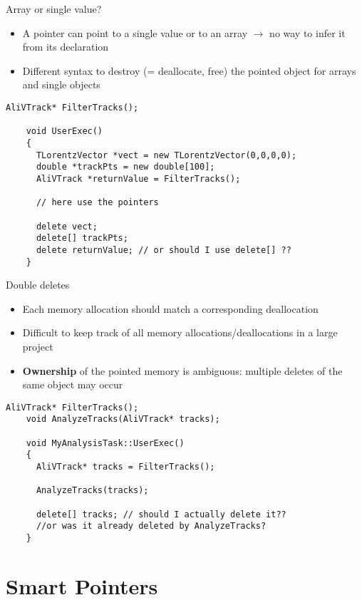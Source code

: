 \documentclass[xcolor={usenames,dvipsnames}]{beamer}
\begin{document}
\begin{frame}[fragile]{Array or single value?}
\begin{itemize}
\item A pointer can point to a single value or to an array $\rightarrow$ no way to infer it from its declaration
\item Different syntax to destroy (= deallocate, free) the pointed object for arrays and single objects 
\end{itemize}
\scriptsize
\begin{lstlisting}[style=base, gobble=4]
    AliVTrack* FilterTracks();

    void UserExec()
    {
      TLorentzVector *vect = new TLorentzVector(0,0,0,0);
      double *trackPts = new double[100];
      AliVTrack *returnValue = FilterTracks();

      // here use the pointers

      delete vect;
      delete[] trackPts;
      delete returnValue; // or should I use delete[] ??
    }
\end{lstlisting}
\end{frame}

\begin{frame}[fragile]{Double deletes}
\begin{itemize}
\item Each memory allocation should match a corresponding deallocation
\item Difficult to keep track of all memory allocations/deallocations in a large project
\item \textbf{Ownership} of the pointed memory is ambiguous: multiple deletes of the same object may occur
\end{itemize}
\scriptsize
\begin{lstlisting}[style=base, gobble=4]
    AliVTrack* FilterTracks();
    void AnalyzeTracks(AliVTrack* tracks);

    void MyAnalysisTask::UserExec()
    {
      AliVTrack* tracks = FilterTracks();

      AnalyzeTracks(tracks);

      delete[] tracks; // should I actually delete it?? 
      //or was it already deleted by AnalyzeTracks?
    }
\end{lstlisting}
\end{frame}

\section{Smart Pointers}
\end{document}
